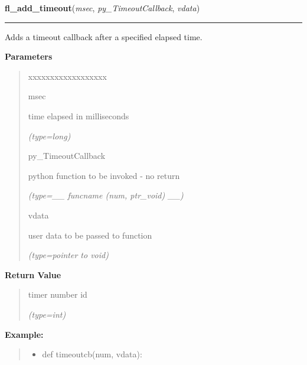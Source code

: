 \hspace{.8\funcindent}\begin{boxedminipage}{\funcwidth}

    \raggedright \textbf{fl\_add\_timeout}(\textit{msec}, \textit{py\_TimeoutCallback}, \textit{vdata})

    \vspace{-1.5ex}

    \rule{\textwidth}{0.5\fboxrule}
\setlength{\parskip}{2ex}
    Adds a timeout callback after a specified elapsed time.

\setlength{\parskip}{1ex}
      \textbf{Parameters}
      \vspace{-1ex}

      \begin{quote}
        \begin{Ventry}{xxxxxxxxxxxxxxxxxx}

          \item[msec]

          time elapsed in milliseconds

            {\it (type=long)}

          \item[py\_TimeoutCallback]

          python function to be invoked - no return

            {\it (type=\_\_ funcname (num, ptr\_void) \_\_)}

          \item[vdata]

          user data to be passed to function

            {\it (type=pointer to void)}

        \end{Ventry}

      \end{quote}

      \textbf{Return Value}
    \vspace{-1ex}

      \begin{quote}
      timer number id

      {\it (type=int)}

      \end{quote}

\textbf{Example:}
\begin{quote}
  \begin{itemize}

  \item
    \setlength{\parskip}{0.6ex}
def timeoutcb(num, vdata):




\end{itemize}
\end{quote}
\end{boxedminipage}
